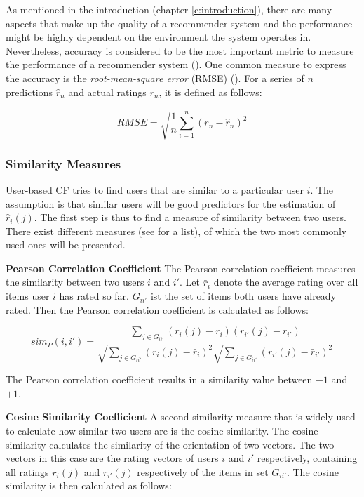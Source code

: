 As mentioned in the introduction (chapter \ref{c:introduction}), there are many aspects that make up the quality of a recommender system and the performance might be highly dependent on the environment the system operates in. Nevertheless, accuracy is considered to be the most important metric to measure the performance of a recommender system (\cite{Ricci_2011}). One common measure to express the accuracy is the \textit{root-mean-square error} (RMSE) (\cite{Ricci_2011}). For a series of $n$ predictions $\hat{r}_n$ and actual ratings $r_n$, it is defined as follows:

\begin{equation}
RMSE = \sqrt{\frac{1}{n} \sum_{i=1}^{n}(r_n - \hat{r}_n)^2}
\label{eq:rmse}
\end{equation}

\subsubsection{Similarity Measures}
\label{ssst:similaritymeasures} User-based CF tries to find users that are similar to a particular user $i$. The assumption is that similar users will be good predictors for the estimation of $\hat{r}_i(j)$. The first step is thus to find a measure of similarity between two users. There exist different measures (see \cite{Amatriain_2011} for a list), of which the two most commonly used ones will be presented.
\newline

\textbf{Pearson Correlation Coefficient} The Pearson correlation coefficient measures the similarity between two users $i$ and $i'$. Let $\bar{r}_i$ denote the average rating over all items user $i$ has rated so far. $G_{ii'}$ ist the set of items both users have already rated. Then the Pearson correlation coefficient is calculated as follows:

\begin{equation}
sim_P(i,i') = \frac{\sum_{j \in G_{ii'}}{(r_i(j)-\bar{r}_i)(r_{i'}(j)-\bar{r}_{i'})}}{\sqrt{\sum_{j \in G_{ii'}}{(r_i(j)-\bar{r}_i)^2}}\sqrt{\sum_{j \in G_{ii'}}{(r_{i'}(j)-\bar{r}_{i'})^2}}}
\label{eq:pearson}
\end{equation}

The Pearson correlation coefficient results in a similarity value between $-1$ and $+1$.
\newline

\textbf{Cosine Similarity Coefficient} A second similarity measure that is widely used to calculate how similar two users are is the cosine similarity. The cosine similarity calculates the similarity of the orientation of two vectors. The two vectors in this case are the rating vectors of users $i$ and $i'$ respectively, containing all ratings $r_{i}(j)$ and $r_{i'}(j)$ respectively of the items in set $G_{ii'}$. The cosine similarity is then calculated as follows:

